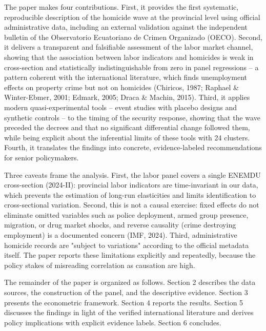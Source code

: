 The paper makes four contributions. First, it provides the first systematic, reproducible description of the homicide wave at the provincial level using official administrative data, including an external validation against the independent bulletin of the Observatorio Ecuatoriano de Crimen Organizado (OECO). Second, it delivers a transparent and falsifiable assessment of the labor market channel, showing that the association between labor indicators and homicides is weak in cross-section and statistically indistinguishable from zero in panel regressions -- a pattern coherent with the international literature, which finds unemployment effects on property crime but not on homicides (Chiricos, 1987; Raphael \& Winter-Ebmer, 2001; Edmark, 2005; Draca \& Machin, 2015). Third, it applies modern quasi-experimental tools -- event studies with placebo designs and synthetic controls -- to the timing of the security response, showing that the wave preceded the decrees and that no significant differential change followed them, while being explicit about the inferential limits of these tools with 24 clusters. Fourth, it translates the findings into concrete, evidence-labeled recommendations for senior policymakers.


Three caveats frame the analysis. First, the labor panel covers a single ENEMDU cross-section (2024-II): provincial labor indicators are time-invariant in our data, which prevents the estimation of long-run elasticities and limits identification to cross-sectional variation. Second, this is not a causal exercise: fixed effects do not eliminate omitted variables such as police deployment, armed group presence, migration, or drug market shocks, and reverse causality (crime destroying employment) is a documented concern (IMF, 2024). Third, administrative homicide records are "subject to variations" according to the official metadata itself. The paper reports these limitations explicitly and repeatedly, because the policy stakes of misreading correlation as causation are high.


The remainder of the paper is organized as follows. Section 2 describes the data sources, the construction of the panel, and the descriptive evidence. Section 3 presents the econometric framework. Section 4 reports the results. Section 5 discusses the findings in light of the verified international literature and derives policy implications with explicit evidence labels. Section 6 concludes.